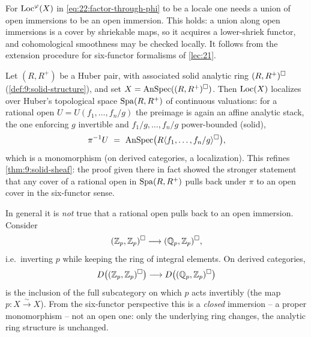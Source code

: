 \begin{remark}
\label{rmk:22:union-open}
For $\operatorname{Loc}^{\varphi}(X)$ in \eqref{eq:22:factor-through-phi} to be a locale one
needs a union of open immersions to be an open immersion. This holds: a union
along open immersions is a cover by shriekable maps, so it acquires a
lower-shriek functor, and cohomological smoothness may be checked locally. It
follows from the extension procedure for six-functor formalisms of
\cref{lec:21}.
\end{remark}

\begin{example}
\label{ex:22:huber-locale}
Let $(R,R^+)$ be a Huber pair, with associated solid analytic ring
$(R,R^+)^\square$ (\cref{def:9:solid-structure}), and set $X=\operatorname{AnSpec}((R,R^+)^
\square)$. Then $\operatorname{Loc}(X)$ localizes over Huber's topological space
$\operatorname{Spa}(R,R^+)$ of continuous valuations: for a rational open
$U=U(f_1,\dots,f_n/g)$ the preimage is again an affine analytic stack, the one
enforcing $g$ invertible and $f_1/g,\dots,f_n/g$ power-bounded (solid),
\begin{equation*}
\pi^{-1}U\ =\ \AnSpec\bigl(R\langle f_1,\dots,f_n/g\rangle^\solid\bigr),
\end{equation*}
which is a monomorphism (on derived categories, a localization). This refines
\cref{thm:9:solid-sheaf}: the proof given there in fact showed the stronger
statement that any cover of a rational open in $\operatorname{Spa}(R,R^+)$ pulls back under
$\pi$ to an open cover in the six-functor sense.
\end{example}

\begin{remark}
\label{rmk:22:warning-rational-open}
In general it is \emph{not} true that a rational open pulls back to an open
immersion. Consider
\begin{equation*}
(\mathbb Z_p,\mathbb Z_p)^\square\longrightarrow(\mathbb Q_p,\mathbb Z_p)^\square,
\end{equation*}
i.e.\ inverting $p$ while keeping the ring of integral elements. On derived
categories,
\begin{equation*}
D\bigl((\mathbb Z_p,\mathbb Z_p)^\square\bigr)\longrightarrow
D\bigl((\mathbb Q_p,\mathbb Z_p)^\square\bigr)
\end{equation*}
is the inclusion of the full subcategory on which $p$ acts invertibly (the map
$p\colon X\xrightarrow{\sim}X$). From the six-functor perspective this is a
\emph{closed} immersion -- a proper monomorphism -- not an open one: only the
underlying ring changes, the analytic ring structure is unchanged.
\end{remark}


